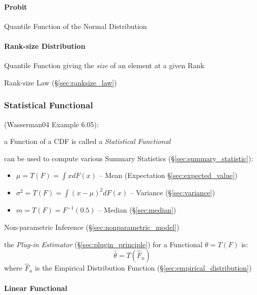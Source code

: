 \paragraph{Probit}\label{sec:probit}\hfill

Quantile Function of the Normal Distribution



\paragraph{Rank-size Distribution}\label{sec:rank_size}\hfill

Quantile Function giving the \emph{size} of an element at a given Rank

\fist Rank-size Law (\S\ref{sec:ranksize_law})



\subsubsection{Statistical Functional}\label{sec:statistical_functional}

(Wasserman04 Example 6.05):

a Function of a CDF is called a \emph{Statistical Functional}

can be used to compute various Summary Statistics
(\S\ref{sec:summary_statistic}):
\begin{itemize}
  \item $\mu = T(F) = \int x dF(x)$
    -- Mean (Expectation \S\ref{sec:expected_value})
  \item $\sigma^2 = T(F) = \int (x - \mu)^2 dF(x)$
    -- Variance (\S\ref{sec:variance})
  \item $m = T(F) = F^{-1}(0.5)$
    -- Median (\S\ref{sec:median})
\end{itemize}

Non-parametric Inference (\S\ref{sec:nonparametric_model})

the \emph{Plug-in Estimator} (\S\ref{sec:plugin_principle}) for a Functional
$\theta = T(F)$ is:
\[
  \hat{\theta} = T(\hat{F}_n)
\]
where $\hat{F}_n$ is the Empirical Distribution Function
(\S\ref{sec:empirical_distribution})



\paragraph{Linear Functional}\label{sec:linear_functional}\hfill

